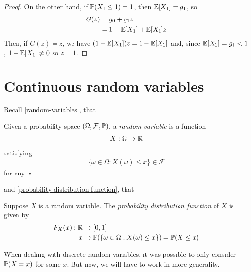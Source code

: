 \documentclass{../../template/note}
\begin{document}
\begin{proof}
        On the other hand, if \(\mathbb P(X_1 \leq 1) = 1\), then \(\mathbb E[X_1] = g_1\), so
        \begin{align*}
            G(z) &= g_0 + g_1z \\
            &= 1 - \mathbb E[X_1] + \mathbb E[X_1]z
        \end{align*}
        Then, if \(G(z) = z\), we have \((1-\mathbb E[X_1])z = 1-\mathbb E[X_1]\) and, since \(\mathbb E[X_1] = g_1 < 1\), \(1-\mathbb E[X_1] \neq 0\) so \(z=1\).
        
    \end{proof}
    
    \section{Continuous random variables}

    Recall \cref{random-variables}, that

    \begin{definition*}
        Given a probability space \((\Omega, \mathcal F, \mathbb P)\), a \emph{random variable} is a function
        \begin{align*}
            X: \Omega \to \mathbb R
        \end{align*}
        satisfying
        \begin{align*}
            \{\omega \in \Omega : X(\omega) \leq x\} \in \mathcal F
        \end{align*}
        for any \(x\).
    \end{definition*}
    
    and \cref{probability-distribution-function}, that

    \begin{definition*}
        Suppose \(X\) is a random variable. The \emph{probability distribution function} of \(X\) is given by
        \begin{align*}
            F_X(x): \mathbb R &\to [0, 1] \\
            x &\mapsto \mathbb P(\{\omega \in \Omega: X(\omega) \leq x\}) = \mathbb P(X \leq x)
        \end{align*}
    \end{definition*}
    
    When dealing with discrete random variables, it was possible to only consider \(\mathbb P(X = x)\) for some \(x\). But now, we will have to work in more generality.
\end{document}
